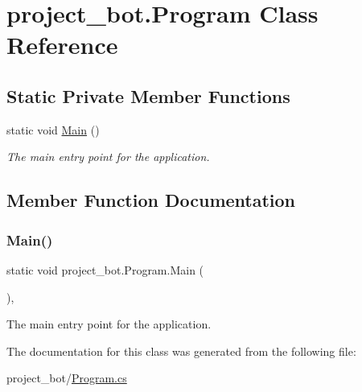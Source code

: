 \hypertarget{classproject__bot_1_1_program}{}\section{project\+\_\+bot.\+Program Class Reference}
\label{classproject__bot_1_1_program}
\subsection*{Static Private Member Functions}
\begin{DoxyCompactItemize}
\item 
static void \hyperlink{classproject__bot_1_1_program_a643ea07220d57bd7e05d5e1dd2664df2}{Main} ()
\begin{DoxyCompactList}\small\item\em The main entry point for the application. \end{DoxyCompactList}\end{DoxyCompactItemize}


\subsection{Member Function Documentation}
\mbox{\label{classproject__bot_1_1_program_a643ea07220d57bd7e05d5e1dd2664df2}} 
\subsubsection{\texorpdfstring{Main()}{Main()}}
{\footnotesize\ttfamily static void project\+\_\+bot.\+Program.\+Main (\begin{DoxyParamCaption}{ }\end{DoxyParamCaption})\hspace{0.3cm}{\ttfamily [static]}, {\ttfamily [private]}}



The main entry point for the application. 



The documentation for this class was generated from the following file\+:\begin{DoxyCompactItemize}
\item 
project\+\_\+bot/\hyperlink{_program_8cs}{Program.\+cs}\end{DoxyCompactItemize}

